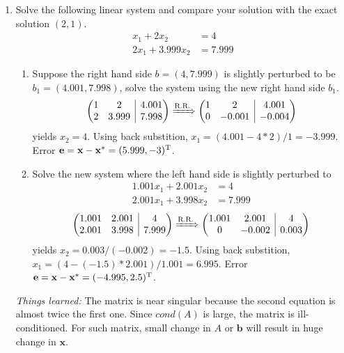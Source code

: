 \documentclass[10pt]{report}
\begin{document}
\begin{enumerate}
	\item 
	Solve the following linear system and compare your solution with the exact solution $(2, 1)$.
	\begin{align*}
		x_1 + 2x_2 &= 4\\
		2x_1 + 3.999x_2 &= 7.999
	\end{align*}
	\begin{enumerate}
		\item 
		Suppose the right hand side $b = (4, 7.999)$ is slightly perturbed to be $b_1=(4.001, 7.998)$, solve the system using the new right hand side $b_1$.
		\[
		\left(
		\begin{array}{@{}cc|c@{}}
		1& 2& 4.001\\
		2& 3.999& 7.998
		\end{array}
		\right)
		\xRightarrow{\text{R.R.}}
		\left(
		\begin{array}{@{}cc|c@{}}
		1& 2& 4.001\\
		0& -0.001& -0.004
		\end{array}
		\right)
		\]
		yields $x_2 = 4$. Using back substition, $x_1 = (4.001-4*2)/1 = -3.999$. Error $\mathbf{e} = \mathbf{x} - \mathbf{x^*} = (5.999, -3)^{\rm T}$.
		
		\item 
		Solve the new system where the left hand side is slightly perturbed to
		\begin{align*}
		1.001x_1 + 2.001x_2 &= 4\\
		2.001x_1 + 3.998x_2 &= 7.999
		\end{align*}
		\[
		\left(
		\begin{array}{@{}cc|c@{}}
		1.001& 2.001& 4\\
		2.001& 3.998& 7.999
		\end{array}
		\right)
		\xRightarrow{\text{R.R.}}
		\left(
		\begin{array}{@{}cc|c@{}}
		1.001& 2.001& 4\\
		0& -0.002& 0.003
		\end{array}
		\right)
		\]
		yields $x_2 = 0.003/(-0.002) = -1.5$. Using back substition, $x_1 = (4-(-1.5)*2.001)/1.001 = 6.995$. Error $\mathbf{e} = \mathbf{x} - \mathbf{x^*} = (-4.995, 2.5)^{\rm T}$.
	\end{enumerate}
	\textit{Things learned:} The matrix is near singular because the second equation is almost twice the first one. Since $cond(A)$ is large, the matrix is ill-conditioned. For such matrix, small change in $A$ or $\mathbf{b}$ will result in huge change in $\mathbf{x}$.
	

\end{enumerate}
\end{document}
